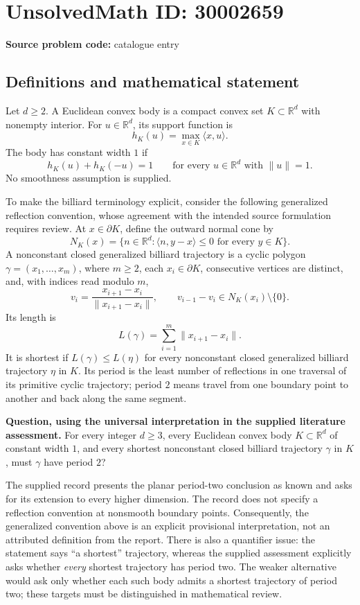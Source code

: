\documentclass[11pt]{article}
\newcommand{\R}{\mathbb{R}}
\begin{document}
\section*{UnsolvedMath ID: 30002659}
\textbf{Source problem code:} catalogue entry
\subsection{Definitions and mathematical statement}
Let \(d\geq 2\). A Euclidean convex body is a compact convex set \(K\subset\R^d\) with nonempty interior. For \(u\in\R^d\), its support function is
\[
h_K(u)=\max_{x\in K}\langle x,u\rangle.
\]
The body has constant width \(1\) if
\[
h_K(u)+h_K(-u)=1\qquad\text{for every }u\in\R^d\text{ with }\|u\|=1.
\]
No smoothness assumption is supplied.

To make the billiard terminology explicit, consider the following generalized reflection convention, whose agreement with the intended source formulation requires review. At \(x\in\partial K\), define the outward normal cone by
\[
N_K(x)=\{n\in\R^d:\langle n,y-x\rangle\leq 0\text{ for every }y\in K\}.
\]
A nonconstant closed generalized billiard trajectory is a cyclic polygon \(\gamma=(x_1,\ldots,x_m)\), where \(m\geq2\), each \(x_i\in\partial K\), consecutive vertices are distinct, and, with indices read modulo \(m\),
\[
v_i=\frac{x_{i+1}-x_i}{\|x_{i+1}-x_i\|},\qquad
v_{i-1}-v_i\in N_K(x_i)\setminus\{0\}.
\]
Its length is
\[
L(\gamma)=\sum_{i=1}^{m}\|x_{i+1}-x_i\|.
\]
It is shortest if \(L(\gamma)\leq L(\eta)\) for every nonconstant closed generalized billiard trajectory \(\eta\) in \(K\). Its period is the least number of reflections in one traversal of its primitive cyclic trajectory; period \(2\) means travel from one boundary point to another and back along the same segment.

\textbf{Question, using the universal interpretation in the supplied literature assessment.} For every integer \(d\geq3\), every Euclidean convex body \(K\subset\R^d\) of constant width \(1\), and every shortest nonconstant closed billiard trajectory \(\gamma\) in \(K\), must \(\gamma\) have period \(2\)?

The supplied record presents the planar period-two conclusion as known and asks for its extension to every higher dimension. The record does not specify a reflection convention at nonsmooth boundary points. Consequently, the generalized convention above is an explicit provisional interpretation, not an attributed definition from the report. There is also a quantifier issue: the statement says ``a shortest'' trajectory, whereas the supplied assessment explicitly asks whether \emph{every} shortest trajectory has period two. The weaker alternative would ask only whether each such body admits a shortest trajectory of period two; these targets must be distinguished in mathematical review.
\end{document}
